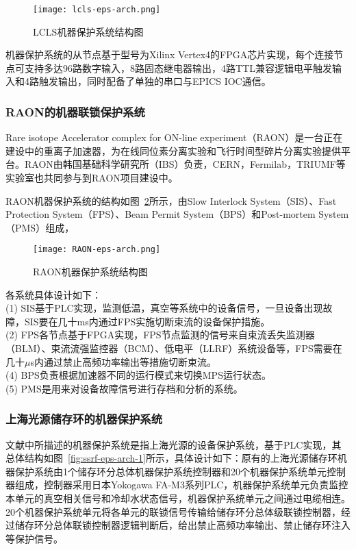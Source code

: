 \begin{figure}[!htb]
	\centering
	\texttt{[image: lcls-eps-arch.png]}
	\caption{LCLS机器保护系统结构图}
	\label{fig:lcls-eps-arch}
\end{figure}

机器保护系统的从节点基于型号为Xilinx Vertex4的FPGA芯片实现，每个连接节点可支持多达96路数字输入，8路固态继电器输出，4路TTL兼容逻辑电平触发输入和4路触发输出，同时配备了单独的串口与EPICS IOC通信。

\subsubsection{RAON的机器联锁保护系统}

Rare isotope Accelerator complex for ON-line experiment（RAON）是一台正在建设中的重离子加速器，为在线同位素分离实验和飞行时间型碎片分离实验提供平台。RAON由韩国基础科学研究所（IBS）负责，CERN，Fermilab，TRIUMF等实验室也共同参与到RAON项目建设中。

RAON机器保护系统的结构如图~\ref{fig:RAON-eps-arch}所示，由Slow Interlock System（SIS）、Fast Protection System（FPS）、Beam Permit System（BPS）和Post-mortem System（PMS）组成\cite{hyunchang-2018}，

\begin{figure}[!htb]
	\centering
	\texttt{[image: RAON-eps-arch.png]}
	\caption{RAON机器保护系统结构图}
	\label{fig:RAON-eps-arch}
\end{figure}


各系统具体设计如下：\\
(1) SIS基于PLC实现，监测低温，真空等系统中的设备信号，一旦设备出现故障，SIS要在几十ms内通过FPS实施切断束流的设备保护措施。\\
(2) FPS各节点基于FPGA实现，FPS节点监测的信号来自束流丢失监测器（BLM）、束流流强监控器（BCM）、低电平（LLRF）系统设备等，FPS需要在几十$\mu$s内通过禁止高频功率输出等措施切断束流。\\
(4) BPS负责根据加速器不同的运行模式来切换MPS运行状态。\\
(5) PMS是用来对设备故障信号进行存档和分析的系统。

\subsubsection{上海光源储存环的机器保护系统}

文献\cite{yu2020}中所描述的机器保护系统是指上海光源的设备保护系统，基于PLC实现，其总体结构如图~\ref{fig:ssrf-eps-arch-1}所示，具体设计如下：原有的上海光源储存环机器保护系统由1个储存环分总体机器保护系统控制器和20个机器保护系统单元控制器组成，控制器采用日本Yokogawa FA-M3系列PLC，机器保护系统单元负责监控本单元的真空相关信号和冷却水状态信号，机器保护系统单元之间通过电缆相连。20个机器保护系统单元将各单元的联锁信号传输给储存环分总体级联锁控制器，经过储存环分总体联锁控制器逻辑判断后，给出禁止高频功率输出、禁止储存环注入等保护信号。

